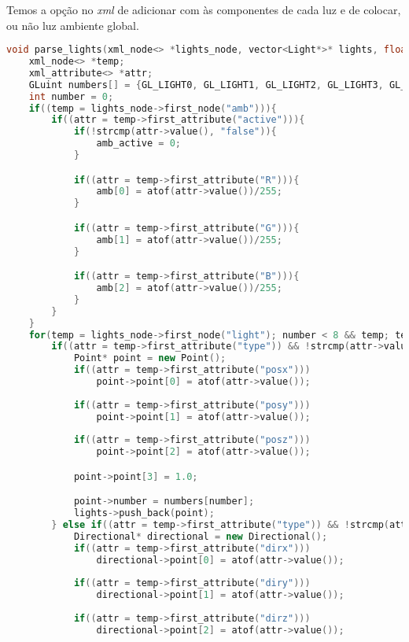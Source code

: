 \documentclass[14pt, a4 paper]{report}
\begin{document}
Temos a opção no \textit{xml} de adicionar com às componentes de cada luz e de colocar, ou não luz ambiente global.
\begin{lstlisting}[language = c++]
void parse_lights(xml_node<> *lights_node, vector<Light*>* lights, float* amb, int* amb_active){
    xml_node<> *temp;
    xml_attribute<> *attr;
    GLuint numbers[] = {GL_LIGHT0, GL_LIGHT1, GL_LIGHT2, GL_LIGHT3, GL_LIGHT4, GL_LIGHT5, GL_LIGHT6, GL_LIGHT7};
    int number = 0;
    if((temp = lights_node->first_node("amb"))){
        if((attr = temp->first_attribute("active"))){
            if(!strcmp(attr->value(), "false")){
                amb_active = 0;
            }

            if((attr = temp->first_attribute("R"))){
                amb[0] = atof(attr->value())/255;
            }

            if((attr = temp->first_attribute("G"))){
                amb[1] = atof(attr->value())/255;
            }

            if((attr = temp->first_attribute("B"))){
                amb[2] = atof(attr->value())/255;
            }
        }
    }
    for(temp = lights_node->first_node("light"); number < 8 && temp; temp = temp->next_sibling("light"), number++){
        if((attr = temp->first_attribute("type")) && !strcmp(attr->value(), "point")){
            Point* point = new Point();
            if((attr = temp->first_attribute("posx")))
                point->point[0] = atof(attr->value());
        
            if((attr = temp->first_attribute("posy")))
                point->point[1] = atof(attr->value());
        
            if((attr = temp->first_attribute("posz")))
                point->point[2] = atof(attr->value());

            point->point[3] = 1.0;

            point->number = numbers[number];
            lights->push_back(point);
        } else if((attr = temp->first_attribute("type")) && !strcmp(attr->value(), "directional")){
            Directional* directional = new Directional();
            if((attr = temp->first_attribute("dirx")))
                directional->point[0] = atof(attr->value());
        
            if((attr = temp->first_attribute("diry")))
                directional->point[1] = atof(attr->value());
        
            if((attr = temp->first_attribute("dirz")))
                directional->point[2] = atof(attr->value());


\end{lstlisting}
\end{document}
